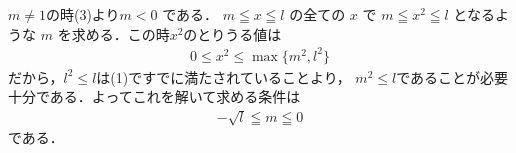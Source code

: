 \documentclass[../../main.tex]{subfiles}
\begin{document}
$m \neq 1$の時(3)より$m < 0$ である．
$m \leqq x \leqq l$ の全ての $x$ で $m \leqq x^2 \leqq l$ となるような $m$ を求める．この時$x^2$のとりうる値は
\begin{align}
  0 \le x^2 \le \max\{m^2, l^2\}
\end{align}
だから，$l^2 \le l$は(1)ですでに満たされていることより，
$m^2 \le l$であることが必要十分である．よってこれを解いて求める条件は
\begin{align}
  -\sqrt{l} \leqq m \leqq 0
\end{align}
である．

\newpage
\end{document}
